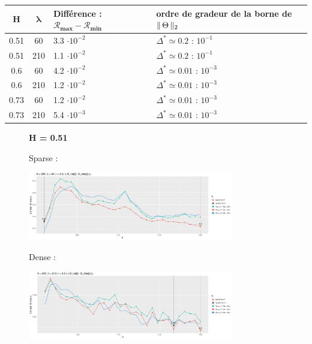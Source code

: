 \begin{table}[H]
	\centering
	\begin{tabularx}{0.7\textwidth}{|cc|X|X|}
		\toprule
		\textbf{H} & $\mathbf{\lambda}$ & \textbf{Différence : } $\mathbf{\mathcal R_{max} - \mathcal R_{min}}$ & ordre de gradeur de la borne de $\lVert \, \Theta \, \rVert _ {2}$ \\
		\midrule
		0.51       & 60                 & 3.3 $\cdot 10^{-2}$                                                   & $\Delta^* \simeq 0.2$ : $10^{-1}$                 \\
		0.51       & 210                & 1.1 $\cdot 10^{-2}$                                                   & $\Delta^* \simeq 0.2$ : $10^{-1}$                 \\
		\midrule
		0.6        & 60                 & 4.2 $\cdot 10^{-2}$                                                   & $\Delta^* \simeq 0.01$ : $10^{-3}$                 \\
0.6        & 210                & 1.2 $\cdot 10^{-2}$                                                   & $\Delta^* \simeq 0.01$ : $10^{-3}$                 \\
		\midrule
0.73       & 60                 & 1.2 $\cdot 10^{-2}$                                                   & $\Delta^* \simeq 0.01$ : $10^{-3}$                 \\
0.73       & 210                & 5.4 $\cdot 10^{-3}$                                                   & $\Delta^* \simeq 0.01$ : $10^{-3}$                 \\
		\bottomrule
	\end{tabularx}
\end{table}


\begin{figure}[H]
	\centering
	\textbf{ H = 0.51 }

	Sparse :

	\includegraphics[width=0.8\textwidth]{Images/risque/N200_t0.3_lbd60.jpg}

	Dense :

	\includegraphics[width=0.8\textwidth]{Images/risque/N200_t0.3_lbd210.jpg}
\end{figure}


